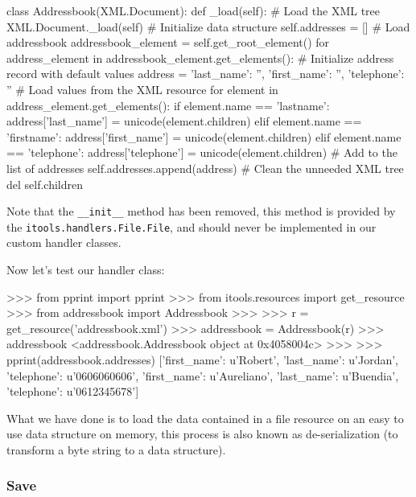 \begin{code}
    class Addressbook(XML.Document):
        def _load(self):
            # Load the XML tree
            XML.Document._load(self)
            # Initialize data structure
            self.addresses = []
            # Load addressbook
            addressbook_element = self.get_root_element()
            for address_element in addressbook_element.get_elements():
                # Initialize address record with default values
                address = {'last_name': '',
                           'first_name': '',
                           'telephone': ''}
                # Load values from the XML resource
                for element in address_element.get_elements():
                    if element.name == 'lastname':
                        address['last_name'] = unicode(element.children)
                    elif element.name == 'firstname':
                        address['first_name'] = unicode(element.children)
                    elif element.name == 'telephone':
                        address['telephone'] = unicode(element.children)
                # Add to the list of addresses
                self.addresses.append(address)
            # Clean the unneeded XML tree
            del self.children
\end{code}

Note that the {\tt \_\_init\_\_} method has been removed, this method is
provided by the {\tt itools.handlers.File.File}, and should never be
implemented in our custom handler classes.

Now let's test our handler class:

\begin{code}
    >>> from pprint import pprint
    >>> from itools.resources import get_resource
    >>> from addressbook import Addressbook
    >>>
    >>> r = get_resource('addressbook.xml')
    >>> addressbook = Addressbook(r)
    >>> addressbook
    <addressbook.Addressbook object at 0x4058004c>
    >>> 
    >>> pprint(addressbook.addresses)
    [{'first_name': u'Robert',
      'last_name': u'Jordan',
      'telephone': u'0606060606'},
     {'first_name': u'Aureliano',
      'last_name': u'Buendia',
      'telephone': u'0612345678'}]
\end{code}

What we have done is to load the data contained in a file resource on an
easy to use data structure on memory, this process is also known as
de-serialization (to transform a byte string to a data structure).

\subsubsection{Save}

